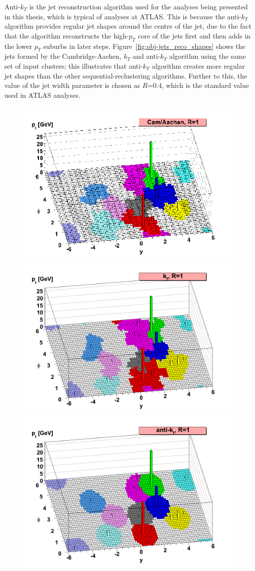 Anti-$k_T$ is the jet reconstruction algorithm used for the analyses being presented in this thesis, which is typical of analyses at ATLAS.
This is because the anti-$k_T$ algorithm provides regular jet shapes around the centre of the jet,
due to the fact that the algorithm reconstructs the high-$p_T$ core of the jets first and then adds in the lower $p_T$ suburbs in later steps.
Figure~\ref{fig:obj-jets_reco_shapes} shows the jets formed by the Cambridge-Aachen, $k_T$ and anti-$k_T$ algorithm using the same set of input clusters;
this illustrates that anti-$k_T$ algorithm creates more regular jet shapes than the other sequential-reclustering algorithms.
Further to this, the value of the jet width parameter is chosen as $R$=0.4, which is the standard value used in ATLAS analyses.

\begin{figure}[!ht]
  \captionsetup[subfigure]{aboveskip=-5pt,justification=centering}
  \begin{center}
     {
      \includegraphics[width=0.45\linewidth, angle=0]{figs/Objects/jets_reco_shapes_ca.png}
    }
     {
      \includegraphics[width=0.45\linewidth, angle=0]{figs/Objects/jets_reco_shapes_kt.png}
    }\\
     {
      \includegraphics[width=0.45\linewidth, angle=0]{figs/Objects/jets_reco_shapes_akt.png}
    }


\end{center}
\end{figure}
